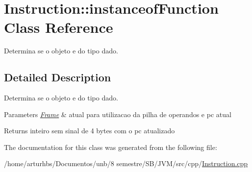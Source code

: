 \hypertarget{classInstruction_1_1instanceofFunction}{}\section{Instruction\+:\+:instanceof\+Function Class Reference}
\label{classInstruction_1_1instanceofFunction}


Determina se o objeto e do tipo dado.  




\subsection{Detailed Description}
Determina se o objeto e do tipo dado. 


\begin{DoxyParams}{Parameters}
{\em \hyperlink{classFrame}{Frame}} & atual para utilizacao da pilha de operandos e pc atual \\
\hline
\end{DoxyParams}
\begin{DoxyReturn}{Returns}
inteiro sem sinal de 4 bytes com o pc atualizado 
\end{DoxyReturn}


The documentation for this class was generated from the following file\+:\begin{DoxyCompactItemize}
\item 
/home/arturhbs/\+Documentos/unb/8 semestre/\+S\+B/\+J\+V\+M/src/cpp/\hyperlink{Instruction_8cpp}{Instruction.\+cpp}\end{DoxyCompactItemize}
